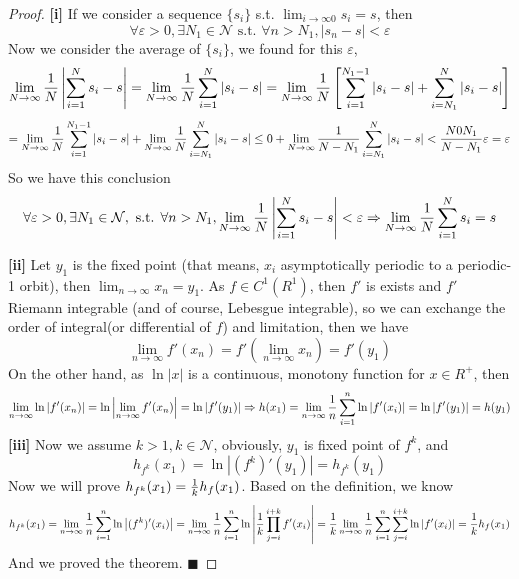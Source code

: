 \documentclass[12pt]{article}
\theoremstyle{plain}
\newtheorem{proof}{\textit{PROOF}}[section]
\begin{document}
{\color{blue}
\begin{proof}\textbf{[i]} If we consider a sequence $\{s_i\}$ s.t. $\lim_{i \rightarrow \infty0} s_i = s$, then 
$$
\forall \varepsilon > 0, \exists N_1 \in \mathcal N \text{ s.t. } \forall n > N_1, |s_n - s| < \varepsilon
$$
Now we consider the average of $\{s_i\}$, we found for this $\varepsilon$,
$$
\lim_{N \rightarrow \infty}{1 \over N}\left|\sum_{i = 1}^{N}s_i - s\right| 
= \lim_{N \rightarrow \infty} {1\over N}\sum_{i = 1}^{N}\left|s_i - s\right| 
= \lim_{N \rightarrow \infty} {1\over N}\left[\sum_{i = 1}^{N_1 - 1}\left|s_i - s\right| + \sum_{i = N_1}^{N}\left|s_i - s\right|\right] 
$$
$$
= \lim_{N \rightarrow \infty} {1\over N}\sum_{i = 1}^{N_1 - 1}\left|s_i - s\right| + \lim_{N \rightarrow \infty}{1\over N}\sum_{i = N_1}^{N}\left|s_i - s\right| 
\leq 0 + \lim_{N \rightarrow \infty}{1\over N - N_1}\sum_{i = N_1}^{N}\left|s_i - s\right|
< {N 0 N_1\over N - N_1}\varepsilon = \varepsilon 
$$
So we have this conclusion
$$
\forall \varepsilon > 0, \exists N_1 \in \mathcal N, \text{ s.t. } \forall n > N_1, \lim_{N \rightarrow \infty}{1 \over N}\left|\sum_{i = 1}^{N}s_i - s\right| < \varepsilon \Rightarrow \lim_{N \rightarrow \infty}{1\over N}\sum_{i =1}^{N}s_i = s
$$

  \noindent \textbf{[ii]} Let $y_1$ is the fixed point (that means, $x_i$ asymptotically periodic to a periodic-1 orbit), then $\lim_{n \rightarrow \infty} x_n = y_1$. As $f \in C^1(R^1)$, then $f'$ is exists and $f'$ Riemann integrable (and of course, Lebesgue integrable), so we can exchange the order of integral(or differential of $f$) and limitation, then we have
$$
\lim_{n \rightarrow \infty}f'(x_n) = f'(\lim_{n \rightarrow \infty} x_n) = f'(y_1)
$$
On the other hand, as $\ln|x|$ is a continuous, monotony function for $x \in R^+$, then 
$$
\lim_{n\rightarrow \infty} \ln |f'(x_n)| = \ln \left|\lim_{n\rightarrow \infty}f'(x_n)\right| = \ln |f'(y_1)| 
\Rightarrow h(x_1) = \lim_{n \rightarrow \infty}{1\over n}\sum_{i = 1}^{n} \ln |f'(x_i)| = \ln|f'(y_1)| = h(y_1)
$$
            \textbf{[iii]} Now we assume $k > 1, k \in \mathcal N$, obviously, $y_1$ is fixed point of $f^k$, and 
$$
h_{f^k}(x_1) = \ln |(f^k)'(y_1)| = h_{f^k}(y_1)
$$
            Now we will prove $h_{f^k}(x_1) = {1\over k} h_{f}(x_1)$. Based on the definition, we know
$$
h_{f^k}(x_1) = \lim_{n \rightarrow \infty}{1 \over n} \sum_{i = 1}^{n}\ln\left|(f^k)'(x_i)\right| 
= \lim_{n \rightarrow \infty}{1 \over n} \sum_{i = 1}^{n}\ln\left|{1\over k}\prod_{j = i}^{i + k}f'(x_i)\right| 
= {1\over k}\lim_{n \rightarrow \infty}{1 \over n} \sum_{i = 1}^{n}\sum_{j = i}^{i + k}\ln\left|f'(x_i)\right| 
= {1 \over k} h_f(x_1)
$$
            And we proved the theorem. $\blacksquare$
\end{proof}
}
\end{document}
